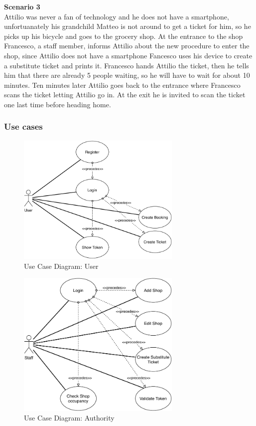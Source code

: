 \textbf{Scenario 3}\\
Attilio was never a fan of technology and he does not have a smartphone, unfortuanately his grandchild Matteo is not around to get a ticket for him, so he picks up his bicycle and goes to the grocery shop. At the entrance to the shop Francesco, a staff member, informs Attilio about the new procedure to enter the shop, since Attilio does not have a smartphone Fancesco uses his device to create a substitute ticket and prints it. Francesco hands Attilio the ticket, then he tells him that there are already 5 people waiting, so he will have to wait for about 10 minutes. Ten minutes later Attilio goes back to the entrance where Francesco scans the ticket letting Attilio go in. At the exit he is invited to scan the ticket one last time before heading home.

\subsubsection{Use cases}

\begin{figure}[H]
    \centering
    \includegraphics[width=0.7\textwidth]{Images/usecasediagram-user.pdf}
    \caption{Use Case Diagram: User}
\end{figure}
\begin{figure}[H]
    \centering
    \includegraphics[width=0.7\textwidth]{Images/usecasediagram-staff.pdf}
    \caption{Use Case Diagram: Authority}
\end{figure}

